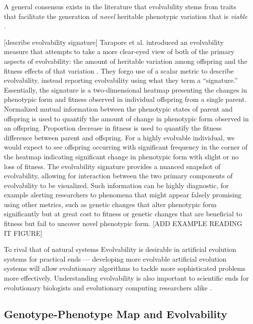 A general consensus exists in the literature that evolvability stems from traits that facilitate the generation of \textit{novel} heritable phenotypic variation that is \textit{viable} \cite{tarapore2015evolvability}.

[describe evolvability signature]
Tarapore et al. introduced an evolvability measure that attempts to take a more clear-eyed view of both of the primary aspects of evolvability: the amount of heritable variation among offspring and the fitness effects of that variation \cite{tarapore2015evolvability}.
They forgo use of a scalar metric to describe evolvability, instead reporting evolvability using what they term a ``signature.''
Essentially, the signature is a two-dimensional heatmap presenting the changes in phenotypic form and fitness observed in individual offspring from a single parent.
Normalized mutual information between the phenotypic states of parent and offspring is used to quantify the amount of change in phenotypic form observed in an offspring.
Proportion decrease in fitness is used to quantify the fitness difference between parent and offspring.
For a highly evolvable individual, we would expect to see offspring occurring with significant frequency in the corner of the heatmap indicating significant change in phenotypic form with slight or no loss of fitness.
The evolvability signature provides a nuanced snapshot of evolvability, allowing for interaction between the two primary components of evolvability to be visualized.
Such information can be highly diagnostic, for example alerting researchers to phenomena that might appear falsely promising using other metrics, such as genetic changes that alter phenotypic form significantly but at great cost to fitness or genetic changes that are beneficial to fitness but fail to uncover novel phenotypic form.
[ADD EXAMPLE READING IT FIGURE]

To rival that of natural systems
Evolvability is desirable in artificial evolution systems for practical ends --- developing more evolvable artificial evolution systems will allow evolutionary algorithms to tackle more sophisticated problems more effectively.
Understanding evolvability is also important to scientific ends for evolutionary biologists and evolutionary computing researchers alike  \cite{mengistu2016evolvability, pigliucci2008evolvability}.


\subsection{Genotype-Phenotype Map and Evolvability}

